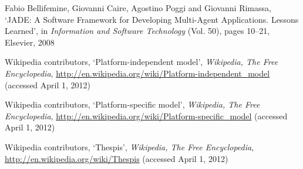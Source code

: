 \begin{thebibliography}{99}
Fabio Bellifemine, Giovanni Caire, Agostino Poggi and Giovanni Rimassa,
`JADE: A Software Framework for Developing Multi-Agent Applications. Lessons Learned',
in \textit{Information and Software Technology} (Vol. 50),
pages 10--21,
Elsevier, 2008


Wikipedia contributors,
`Platform-independent model',
\textit{Wikipedia, The Free Encyclopedia},
\url{http://en.wikipedia.org/wiki/Platform-independent_model} (accessed April 1, 2012)

Wikipedia contributors,
`Platform-specific model',
\textit{Wikipedia, The Free Encyclopedia},
\url{http://en.wikipedia.org/wiki/Platform-specific_model} (accessed April 1, 2012)

Wikipedia contributors,
`Thespis',
\textit{Wikipedia, The Free Encyclopedia},
\url{http://en.wikipedia.org/wiki/Thespis} (accessed April 1, 2012)



\end{thebibliography}